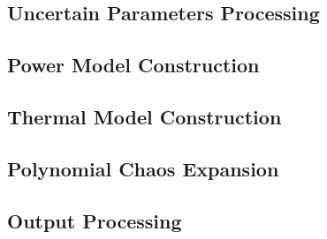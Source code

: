 \subsection{Uncertain Parameters Processing} 


\subsection{Power Model Construction} 


\subsection{Thermal Model Construction} 


\subsection{Polynomial Chaos Expansion} 


\subsection{Output Processing} 

